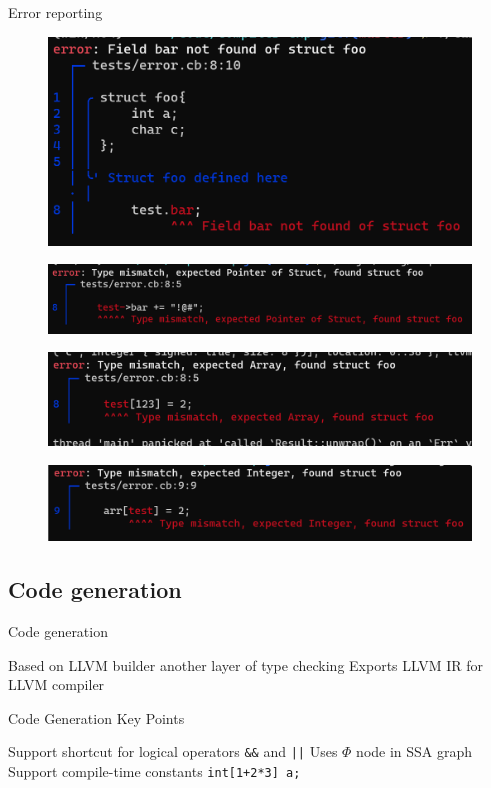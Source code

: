 \documentclass[aspectratio=1610]{ctexbeamer}
\begin{document}
\begin{frame}[allowframebreaks]{Error reporting}
    \begin{figure}[htp]
      \centering
      \includegraphics[width=.7\linewidth]{image5.png}
      \caption{}
    \end{figure}
    \begin{figure}[htp]
      \centering
      \includegraphics[width=.8\linewidth]{image6.png}
      \caption{}
    \end{figure}
    \begin{figure}[htp]
      \centering
      \includegraphics[width=.8\linewidth]{image7.png}
      \caption{}
    \end{figure}
    \begin{figure}[htp]
      \centering
      \includegraphics[width=.8\linewidth]{image8.png}
      \caption{}
    \end{figure}
\end{frame}
\subsection{Code generation}
\begin{frame}{Code generation}
    \begin{outline}
        \1 Based on LLVM builder
            \2 another layer of type checking
        \1 Exports LLVM IR for LLVM compiler
    \end{outline}
\end{frame}
\begin{frame}{Code Generation Key Points}
    \begin{outline}
        \1 Support shortcut for logical operators
            \2 \texttt{\&\&} and \texttt{||}
            \2 Uses $\Phi$ node in SSA graph
        \1 Support compile-time constants
            \2 \texttt{int[1+2*3] a;}
    \end{outline}
\end{frame}
\end{document}
